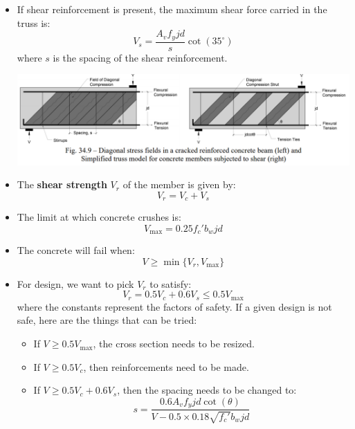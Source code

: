 \documentclass{article}
\begin{document}
\begin{itemize}
    \item If shear reinforcement is present, the maximum shear force carried in the truss is:
    \begin{equation}
        V_s = \frac{A_vf_yjd}{s}\cot(35^\circ)
        \label{eq:}
    \end{equation}
    where $s$ is the spacing of the shear reinforcement.
    \begin{center}
        \includegraphics[width=\linewidth]{shear_truss.PNG}
    \end{center}
    \item The \textbf{shear strength} $V_r$ of the member is given by:
    \begin{equation}
        V_r = V_c + V_s
        \label{eq:}
    \end{equation}
    \item The limit at which concrete crushes is:
    \begin{equation}
        V_\text{max} = 0.25f_c'b_wjd
        \label{eq:}
    \end{equation}
    \item The concrete will fail when:
    \begin{equation}
        V \ge \min\{V_r, V_\text{max}\}
    \end{equation}
    \item For design, we want to pick $V_r$ to satisfy:
    \begin{equation}
        V_r = 0.5V_c + 0.6V_s \le 0.5 V_\text{max}
        \label{eq:}
    \end{equation}
    where the constants represent the factors of safety. If a given design is not safe, here are the things that can be tried:
    \begin{itemize}
        \item If $V \ge 0.5V_\text{max}$, the cross section needs to be resized.
        \item If $V \ge 0.5V_c$, then reinforcements need to be made.
        \item If $V \ge 0.5V_c + 0.6V_s$, then the spacing needs to be changed to:
        \begin{equation}
            s = \frac{0.6A_vf_yjd\cot(\theta)}{V-0.5\times 0.18\sqrt{f_c'}b_wjd}
            \label{eq:}
        \end{equation}
        

\end{itemize}
\end{itemize}
\end{document}
